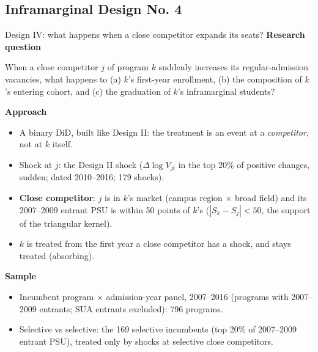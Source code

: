 \documentclass{beamer}
\begin{document}
\subsection{Inframarginal Design No. 4}
\begin{frame}{Design IV: what happens when a close competitor expands its seats?}
\scriptsize
\textbf{Research question}

When a close competitor $j$ of program $k$ suddenly increases its regular-admission vacancies, what happens to
(a) $k$'s first-year enrollment, (b) the composition of $k$'s entering cohort, and (c) the graduation of $k$'s inframarginal students?

\vspace{0.10cm}
\textbf{Approach}
\begin{itemize}
    \item A binary DiD, built like Design II: the treatment is an event at a \emph{competitor}, not at $k$ itself.
    \item Shock at $j$: the Design II shock ($\Delta\log V_{jt}$ in the top 20\% of positive changes, sudden; dated 2010--2016; 179 shocks).
    \item \textbf{Close competitor}: $j$ is in $k$'s market (campus region $\times$ broad field) and its 2007--2009 entrant PSU is within 50 points of $k$'s
    ($|S_k-S_j|<50$, the support of the triangular kernel).
    \item $k$ is treated from the first year a close competitor has a shock, and stays treated (absorbing).
\end{itemize}

\vspace{0.06cm}
\textbf{Sample}
\begin{itemize}
    \item Incumbent program $\times$ admission-year panel, 2007--2016 (programs with 2007--2009 entrants; SUA entrants excluded): 796 programs.
    \item Selective vs selective: the 169 selective incumbents (top 20\% of 2007--2009 entrant PSU), treated only by shocks at selective close competitors.
\end{itemize}
\end{frame}
\end{document}
